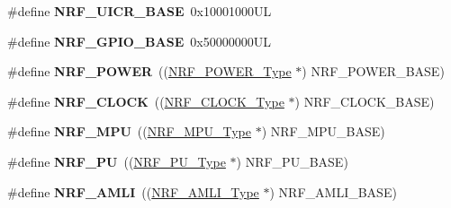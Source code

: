 \begin{DoxyCompactItemize}
\item 
\hypertarget{group___device___peripheral___registers_ga722f3bdce4d65667c433651280eb8260}{}\#define {\bfseries N\+R\+F\+\_\+\+U\+I\+C\+R\+\_\+\+B\+A\+S\+E}~0x10001000\+U\+L\label{group___device___peripheral___registers_ga722f3bdce4d65667c433651280eb8260}

\item 
\hypertarget{group___device___peripheral___registers_gabb576306b59cc3553dd8749271b776f6}{}\#define {\bfseries N\+R\+F\+\_\+\+G\+P\+I\+O\+\_\+\+B\+A\+S\+E}~0x50000000\+U\+L\label{group___device___peripheral___registers_gabb576306b59cc3553dd8749271b776f6}

\item 
\hypertarget{group___device___peripheral___registers_ga736bacc5025b0c30217b06fdf6778dc3}{}\#define {\bfseries N\+R\+F\+\_\+\+P\+O\+W\+E\+R}~((\hyperlink{struct_n_r_f___p_o_w_e_r___type}{N\+R\+F\+\_\+\+P\+O\+W\+E\+R\+\_\+\+Type}          $\ast$) N\+R\+F\+\_\+\+P\+O\+W\+E\+R\+\_\+\+B\+A\+S\+E)\label{group___device___peripheral___registers_ga736bacc5025b0c30217b06fdf6778dc3}

\item 
\hypertarget{group___device___peripheral___registers_ga9d8604a9f9620bd844b81c06934db8b9}{}\#define {\bfseries N\+R\+F\+\_\+\+C\+L\+O\+C\+K}~((\hyperlink{struct_n_r_f___c_l_o_c_k___type}{N\+R\+F\+\_\+\+C\+L\+O\+C\+K\+\_\+\+Type}          $\ast$) N\+R\+F\+\_\+\+C\+L\+O\+C\+K\+\_\+\+B\+A\+S\+E)\label{group___device___peripheral___registers_ga9d8604a9f9620bd844b81c06934db8b9}

\item 
\hypertarget{group___device___peripheral___registers_ga698f310d30463f49caaa73ff36da5404}{}\#define {\bfseries N\+R\+F\+\_\+\+M\+P\+U}~((\hyperlink{struct_n_r_f___m_p_u___type}{N\+R\+F\+\_\+\+M\+P\+U\+\_\+\+Type}            $\ast$) N\+R\+F\+\_\+\+M\+P\+U\+\_\+\+B\+A\+S\+E)\label{group___device___peripheral___registers_ga698f310d30463f49caaa73ff36da5404}

\item 
\hypertarget{group___device___peripheral___registers_gaefca7c02252ec36278292453cda3b741}{}\#define {\bfseries N\+R\+F\+\_\+\+P\+U}~((\hyperlink{struct_n_r_f___p_u___type}{N\+R\+F\+\_\+\+P\+U\+\_\+\+Type}             $\ast$) N\+R\+F\+\_\+\+P\+U\+\_\+\+B\+A\+S\+E)\label{group___device___peripheral___registers_gaefca7c02252ec36278292453cda3b741}

\item 
\hypertarget{group___device___peripheral___registers_ga34697a8a9525fc32eb834e4cd2b62068}{}\#define {\bfseries N\+R\+F\+\_\+\+A\+M\+L\+I}~((\hyperlink{struct_n_r_f___a_m_l_i___type}{N\+R\+F\+\_\+\+A\+M\+L\+I\+\_\+\+Type}           $\ast$) N\+R\+F\+\_\+\+A\+M\+L\+I\+\_\+\+B\+A\+S\+E)\label{group___device___peripheral___registers_ga34697a8a9525fc32eb834e4cd2b62068}


\end{DoxyCompactItemize}
